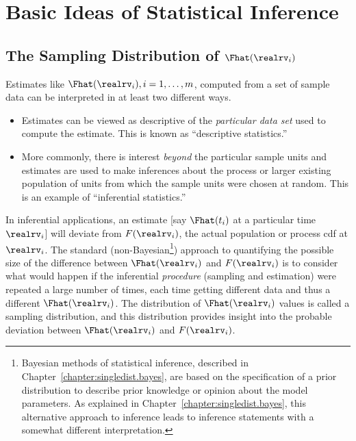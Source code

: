  \section{Basic Ideas of Statistical Inference}
\label{section:basic.iease.of.infer}
 \subsection{The Sampling Distribution of $\Fhat(\realrv_{i})$}
\label{section:sampling.dist.of.fhat}
Estimates like $\Fhat(\realrv_{i}), i=1, \ldots , m$, computed from
a set of sample data can be interpreted in at least
two different ways.
\begin{itemize}
\item
Estimates can be viewed as
descriptive of the {\em particular data set} used to compute the estimate.
This is known as ``descriptive statistics.''
\item
More commonly, there is interest {\em beyond} the particular
sample units and estimates are used to make inferences about the process or
larger existing population of units from which the sample units were
chosen at random. This is an example of ``inferential statistics.''
\end{itemize}
In inferential applications, an estimate [say $\Fhat(t_{i})$ at a
particular time $\realrv_{i}$] will deviate from $F(\realrv_{i})$, the
actual population or process cdf at $\realrv_{i}$.  The standard
(non-Bayesian\footnote{Bayesian methods of statistical inference,
described in Chapter~\ref{chapter:singledist.bayes}, are based on the
specification of a prior distribution to describe prior knowledge or
opinion about the model parameters. As explained in
Chapter~\ref{chapter:singledist.bayes}, this alternative approach to
inference leads to inference statements with a somewhat different
interpretation.}) approach to quantifying the possible size of the
difference between $\Fhat(\realrv_{i})$ and $F(\realrv_{i})$ is to
consider what would happen if the inferential {\em procedure}
(sampling and estimation) were repeated a large number of times, each
time getting different data and thus a different $\Fhat(\realrv_{i})$.
The distribution of $\Fhat(\realrv_{i})$ values is called a sampling
distribution, and this distribution provides insight into the probable
deviation between $\Fhat(\realrv_{i})$ and $F(\realrv_{i})$.

